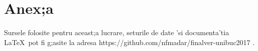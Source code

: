 \section{Anex;a}

\paragraph{}

Sursele folosite pentru aceast;a lucrare, seturile de date 'si documenta'tia \LaTeX\ pot fi g;asite la adresa https://github.com/nfmadar/finalver-unibuc2017 .